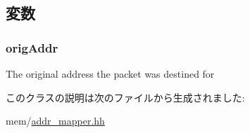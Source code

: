 \subsection{変数}
\hypertarget{classAddrMapper_1_1AddrMapperSenderState_a5a3998c45311174a053b237993cbbfe7}{
\subsubsection[{origAddr}]{ {\bf origAddr}}}
\label{classAddrMapper_1_1AddrMapperSenderState_a5a3998c45311174a053b237993cbbfe7}
The original address the packet was destined for 

このクラスの説明は次のファイルから生成されました:\begin{DoxyCompactItemize}
\item 
mem/\hyperlink{addr__mapper_8hh}{addr\_\-mapper.hh}\end{DoxyCompactItemize}
